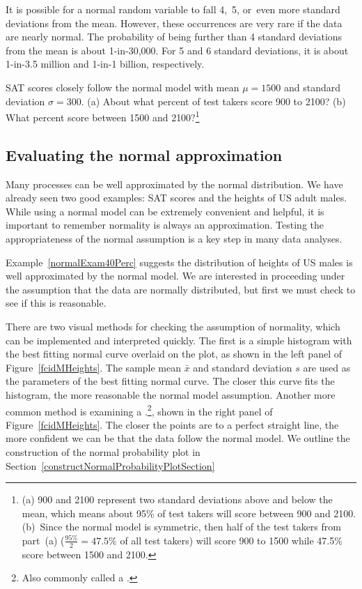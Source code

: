 It is possible for a normal random variable to fall 4,~5, or~even more standard deviations from the mean. However, these occurrences are very rare if the data are nearly normal. The probability of being further than 4 standard deviations from the mean is about 1-in-30,000. For 5 and 6 standard deviations, it is about 1-in-3.5 million and 1-in-1 billion, respectively.

\begin{exercise}
SAT scores closely follow the normal model with mean $\mu = 1500$ and standard deviation $\sigma = 300$. (a) About what percent of test takers score 900 to 2100? (b) What percent score between 1500 and 2100?\footnote{(a) 900 and 2100 represent two standard deviations above and below the mean, which means about 95\% of test takers will score between 900 and 2100. (b)~Since the normal model is symmetric, then half of the test takers from part~(a) ($\frac{95\%}{2} = 47.5\%$ of all test takers) will score 900 to 1500 while 47.5\% score between 1500 and 2100.}
\end{exercise}


\subsection{Evaluating the normal approximation}
\label{assessingNormal}

Many processes can be well approximated by the normal distribution. We have already seen two good examples: SAT scores and the heights of US adult males. While using a normal model can be extremely convenient and helpful, it is important to remember normality is always an approximation. Testing the appropriateness of the normal assumption is a key step in many data analyses.

Example~\ref{normalExam40Perc} suggests the distribution of heights of US males is well approximated by the normal model. We are interested in proceeding under the assumption that the data are normally distributed, but first we must check to see if this is reasonable.

There are two visual methods for checking the assumption of normality, which can be implemented and interpreted quickly. The first is a simple histogram with the best fitting normal curve overlaid on the plot, as shown in the left panel of Figure~\ref{fcidMHeights}. The sample mean $\bar{x}$ and standard deviation $s$ are used as the parameters of the best fitting normal curve. The closer this curve fits the histogram, the more reasonable the normal model assumption. Another more common method is examining a .\footnote{Also commonly called a .}, shown in the right panel of Figure~\ref{fcidMHeights}. The closer the points are to a perfect straight line, the more confident we can be that the data follow the normal model. We outline the construction of the normal probability plot in Section~\ref{constructNormalProbabilityPlotSection}

